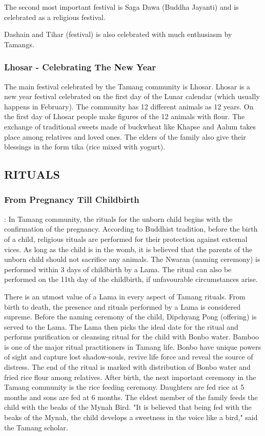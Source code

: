 \documentclass[a4paper,14pt]{article}
\begin{document}
\begin{flushleft}
The second most important festival is Saga Dawa (Buddha Jayanti) and is celebrated as a religious festival.

Dashain and Tihar (festival) is also celebrated with much enthusiasm by Tamangs.

\subsubsection{Lhosar - Celebrating The New Year }
The main festival celebrated by the Tamang community is Lhosar. Lhosar is a new year festival celebrated on the first day of the Lunar calendar (which usually happens in February). The community has 12 different animals as 12 years. On the first day of Lhosar people make figures of the 12 animals with flour. The exchange of traditional sweets made of buckwheat like Khapse and Aalum takes place among relatives and loved ones. The elders of the family also give their blessings in the form tika (rice mixed with yogurt).

	\newpage

	\subsection{RITUALS}

	\subsubsection{From Pregnancy Till Childbirth} :
In Tamang community, the rituals for the unborn child begins with the confirmation of the pregnancy. According to Buddhist tradition, before the birth of a child, religious rituals are performed for their protection against external vices. As long as the child is in the womb, it is believed that the parents of the unborn child should not sacrifice any animals. The Nwaran (naming ceremony) is performed within 3 days of childbirth by a Lama. The ritual can also be performed on the 11th day of the childbirth, if unfavourable circumstances arise. 

There is an utmost value of a Lama in every aspect of Tamang rituals. From birth to death, the presence and rituals performed by a Lama is considered supreme. Before the naming ceremony of the child, Dipchyang Pong (offering) is served to the Lama. The Lama then picks the ideal date for the ritual and performs purification or cleansing ritual for the child with Bonbo water. Bamboo is one of the major ritual practitioners in Tamang life. Bonbo have unique powers of sight and capture lost shadow-souls, revive life force and reveal the source of distress. The end of the ritual is marked with distribution of Bonbo water and fried rice flour among relatives. 
After birth, the next important ceremony in the Tamang community is the rice feeding ceremony. Daughters are fed rice at 5 months and sons are fed at 6 months. The eldest member of the family feeds the child with the beaks of the Mynah Bird. "It is believed that being fed with the beaks of the Mynah, the child develops a sweetness in the voice like a bird," said the Tamang scholar. 




\end{flushleft}
\end{document}
